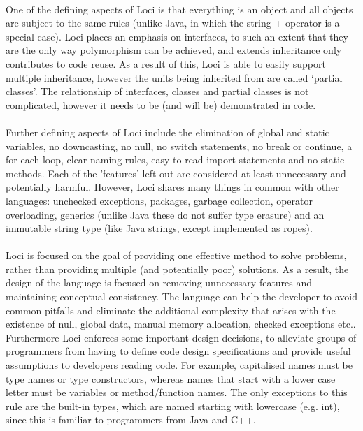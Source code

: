 \documentclass{article}
\begin{document}
\paragraph{}
One of the defining aspects of Loci is that everything is an object and all objects are subject to the same rules (unlike Java, in which the string + operator is a special case). Loci places an emphasis on interfaces, to such an extent that they are the only way polymorphism can be achieved, and extends inheritance only contributes to code reuse. As a result of this, Loci is able to easily support multiple inheritance, however the units being inherited from are called ‘partial classes’. The relationship of interfaces, classes and partial classes is not complicated, however it needs to be (and will be) demonstrated in code.

\paragraph{}
Further defining aspects of Loci include the elimination of global and static variables, no downcasting, no null, no switch statements, no break or continue, a for-each loop, clear naming rules, easy to read import statements and no static methods. Each of the 'features' left out are considered at least unnecessary and potentially harmful. However, Loci shares many things in common with other languages: unchecked exceptions, packages, garbage collection, operator overloading, generics (unlike Java these do not suffer type erasure) and an immutable string type (like Java strings, except implemented as ropes).

\paragraph{}
Loci is focused on the goal of providing one effective method to solve problems, rather than providing multiple (and potentially poor) solutions. As a result, the design of the language is focused on removing unnecessary features and maintaining conceptual consistency. The language can help the developer to avoid common pitfalls and eliminate the additional complexity that arises with the existence of null, global data, manual memory allocation, checked exceptions etc.. Furthermore Loci enforces some important design decisions, to alleviate groups of programmers from having to define code design specifications and provide useful assumptions to developers reading code. For example, capitalised names must be type names or type constructors, whereas names that start with a lower case letter must be variables or method/function names. The only exceptions to this rule are the built-in types, which are named starting with lowercase (e.g. int), since this is familiar to programmers from Java and C++.
\end{document}
